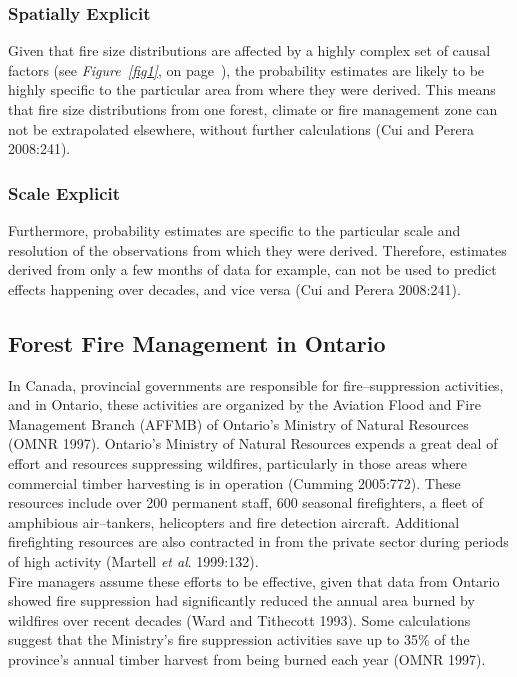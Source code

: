 \begin{spacing}{1.5}
\subsubsection{Spatially Explicit}
Given that fire size distributions are affected by a highly complex set of causal factors (see \emph{Figure~\ref{fig1}}, on page~\pageref{fig1}), the probability estimates are likely to be highly specific to the particular area from where they were derived. This means that fire size distributions from one forest, climate or fire management zone can not be extrapolated elsewhere, without further calculations (Cui and Perera 2008:241).

\subsubsection{Scale Explicit}
Furthermore, probability estimates are specific to the particular scale and resolution of the observations from which they were derived. Therefore, estimates derived from only a few months of data for example, can not be used to predict effects happening over decades, and vice versa (Cui and Perera 2008:241).

\subsection{Forest Fire Management in Ontario}
In Canada, provincial governments are responsible for fire--suppression activities, and in Ontario, these activities are organized by the Aviation Flood and Fire Management Branch (AFFMB) of Ontario's Ministry of Natural Resources (OMNR 1997). Ontario's Ministry of Natural Resources expends a great deal of effort and resources suppressing wildfires, particularly in those areas where commercial timber harvesting is in operation (Cumming 2005:772). These resources include over 200 permanent staff, 600 seasonal firefighters, a fleet of amphibious air--tankers, helicopters and fire detection aircraft. Additional firefighting  resources are also contracted in from the private sector during periods of high activity (Martell \emph{et al}. 1999:132). \\

\noindent Fire managers assume these efforts to be effective, given that data from Ontario showed fire suppression had significantly reduced the annual area burned by wildfires over recent decades (Ward and Tithecott 1993). Some calculations suggest that the Ministry's fire suppression activities save up to 35\% of the province's annual timber harvest from being burned each year (OMNR 1997). \\


\end{spacing}
